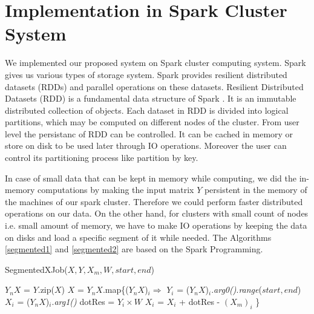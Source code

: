 \documentclass[12pt,notitlepage,oneside]{report}
\newcommand\tab[1][.5cm]{\hspace*{#1}}
\begin{document}
\chapter{Implementation in Spark Cluster System}
	\label{c:8}
We implemented our proposed system on Spark \cite{spark} cluster computing system. Spark gives us various types of storage system. Spark provides resilient distributed datasets (RDDs) and parallel operations on these datasets. Resilient Distributed Datasets (RDD) is a fundamental data structure of Spark \cite{spark-site}. It is an immutable distributed collection of objects. Each dataset in RDD is divided into logical partitions, which may be computed on different nodes of the cluster. From user level the persistanc of RDD can be controlled. It can be cached in memory or store on disk to be used later through IO operations. Moreover the user can control its partitioning process like partition by key.

In case of small data that can be kept in memory while computing, we did the in-memory computations by making the input matrix $Y$ persistent in the memory of the machines of our spark cluster. Therefore we could perform faster distributed operations on our data. On the other hand, for clusters with small count of nodes i.e. small amount of memory, we have to make IO operations by keeping the data on disks and load a specific segment of it while needed. 
The Algorithms \ref{segmented1} and \ref{segmented2} are based on the Spark Programming. 







\begin{algorithm} [!htbp]
  \caption{SegmentedXJob($X,Y,X_m,W,start,end$)}
  \begin{algorithmic} [1]
\label{segmented1}
	\STATE $Y_nX$ = $Y$.zip($X$)
	\STATE $X$ = $Y_nX$.map\{($Y_nX$)$_i \Rightarrow$
	        \STATE \tab $Y_i$ = ($Y_nX$)$_i$.\textit{arg0()}.\textit{range}($start,end$)
			\STATE \tab $X_i$ = ($Y_nX$)$_i$.\textit{arg1()}
			\STATE \tab dotRes = $Y_i \times W$
			\STATE \tab $X_i$ = $X_i$ + dotRes - $(X_m)_i$
			\STATE \}
  \end{algorithmic}
\end{algorithm}
\end{document}
